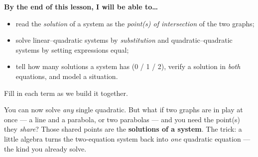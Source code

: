 \documentclass[10pt]{article}
\begin{document}

\vspace{0.02in}

\begin{objectivebox}
\textbf{By the end of this lesson, I will be able to\dots}
\begin{itemize}\setlength{\itemsep}{2pt}
  \item read the \emph{solution} of a system as the \emph{point(s) of intersection} of the two graphs;
  \item solve linear--quadratic systems by \emph{substitution} and quadratic--quadratic systems by setting expressions equal;
  \item tell how many solutions a system has (0 / 1 / 2), verify a solution in \emph{both} equations, and model a situation.
\end{itemize}
\end{objectivebox}

\vspace{0.02in}

\begin{vocabbox}
\small
Fill in each term as we build it together.
\par\vspace{2pt}
\end{vocabbox}

\begin{hookbox}
You can now solve \emph{any} single quadratic. But what if two graphs are in play at once --- a line and a
parabola, or two parabolas --- and you need the point(s) they \emph{share}? Those shared points are the
\textbf{solutions of a system}. The trick: a little algebra turns the two-equation system back into \emph{one}
quadratic equation --- the kind you already solve.
\end{hookbox}
\end{document}
